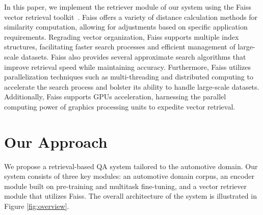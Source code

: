 \documentclass[mathematics,article,submit,moreauthors]{Definitions/mdpi}
\newcommand{\1}[1]{\mathds{1}\left[#1\right]}
\newcommand{\figref}[1]{Figure \ref{#1}}
\begin{document}
In this paper, we implement the retriever module of our system using the Faiss vector retrieval toolkit~\cite{faiss}. Faiss offers a variety of distance calculation methods for similarity computation, allowing for adjustments based on specific application requirements. Regrading vector organization, Faiss supports multiple index structures, facilitating faster search processes and efficient management of large-scale datasets. Faiss also provides several approximate search algorithms that improve retrieval speed while maintaining accuracy. Furthermore, Faiss utilizes parallelization techniques such as multi-threading and distributed computing to accelerate the search process and bolster its ability to handle large-scale datasets. Additionally, Faiss supports GPUs acceleration, harnessing the parallel computing power of graphics processing units to expedite vector retrieval.


\section{Our Approach}

We propose a retrieval-based QA system tailored to the automotive domain. Our system consists of three key modules: an automotive domain corpus, an encoder module built on pre-training and multitask fine-tuning, and a vector retriever module that utilizes Faiss. The overall architecture of the system is illustrated in \figref{fig:overview}.
\end{document}

